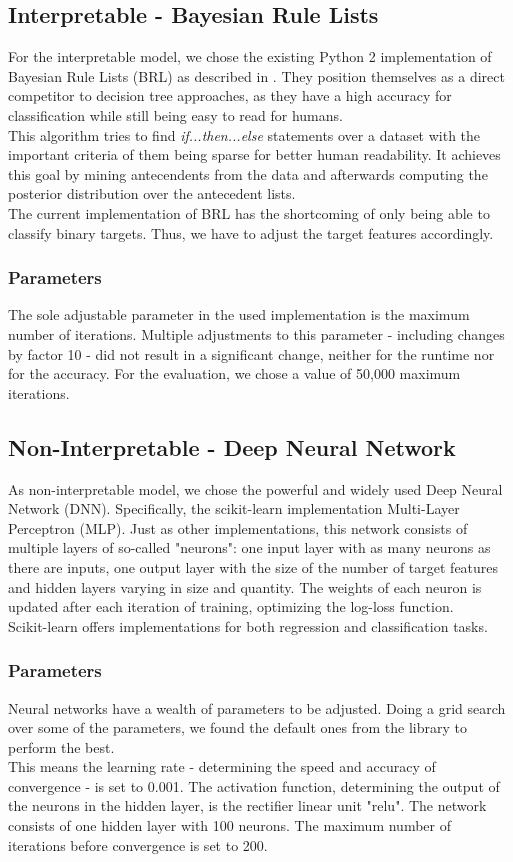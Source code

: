 \documentclass[conference,comsoc]{IEEEtran}
\begin{document}
\subsection{Interpretable - Bayesian Rule Lists}
For the interpretable model, we chose the existing Python 2 implementation of Bayesian Rule Lists (BRL) as described in \cite{Letham2015}. 
They position themselves as a direct competitor to decision tree approaches, as they have a high accuracy for classification while still being easy to read for humans. \\
This algorithm tries to find \emph{if...then...else} statements over a dataset with the important criteria of them being sparse for better human readability. 
It achieves this goal by mining antecendents from the data and afterwards computing the posterior distribution over the antecedent lists.\\
The current implementation of BRL has the shortcoming of only being able to classify binary targets. 
Thus, we have to adjust the target features accordingly.
\subsubsection{Parameters}
The sole adjustable parameter in the used implementation is the maximum number of iterations. 
Multiple adjustments to this parameter - including changes by factor 10 - did not result in a significant change, neither for the runtime nor for the accuracy. 
For the evaluation, we chose a value of 50,000 maximum iterations.

\subsection{Non-Interpretable - Deep Neural Network}
As non-interpretable model, we chose the powerful and widely used Deep Neural Network (DNN). 
Specifically, the scikit-learn implementation Multi-Layer Perceptron (MLP). 
Just as other implementations, this network consists of multiple layers of so-called "neurons": one input layer with as many neurons as there are inputs, one output layer with the size of the number of target features and hidden layers varying in size and quantity. 
The weights of each neuron is updated after each iteration of training, optimizing the log-loss function. \\
Scikit-learn offers implementations for both regression and classification tasks.
\subsubsection{Parameters}
Neural networks have a wealth of parameters to be adjusted. 
Doing a grid search over some of the parameters, we found the default ones from the library to perform the best.\\
This means the learning rate - determining the speed and accuracy of convergence - is set to 0.001. 
The activation function, determining the output of the neurons in the hidden layer, is the rectifier linear unit "relu". 
The network consists of one hidden layer with 100 neurons. 
The maximum number of iterations before convergence is set to 200.
\end{document}
